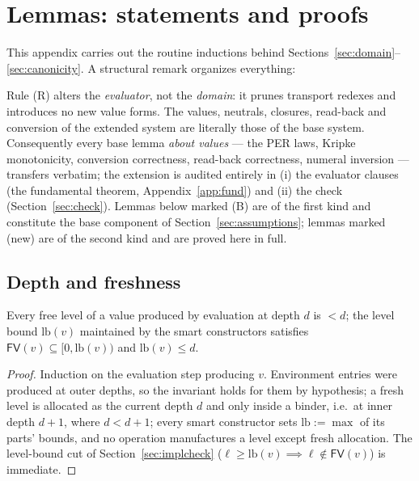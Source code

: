 \documentclass{lmcs}
\newcommand{\FV}{\mathsf{FV}}
\begin{document}
\section{Lemmas: statements and proofs}
\label{app:cases}

This appendix carries out the routine inductions behind
Sections~\ref{sec:domain}--\ref{sec:canonicity}.  A structural remark
organizes everything:

\begin{rem}\label{rem:samedomain}
  Rule (R) alters the \emph{evaluator}, not the \emph{domain}: it
  prunes transport redexes and introduces no new value forms.  The
  values, neutrals, closures, read-back and conversion of the
  extended system are literally those of the base system.
  Consequently every base lemma \emph{about values} --- the PER laws,
  Kripke monotonicity, conversion correctness, read-back correctness,
  numeral inversion --- transfers verbatim; the extension is audited
  entirely in (i) the evaluator clauses (the fundamental theorem,
  Appendix~\ref{app:fund}) and (ii) the check
  (Section~\ref{sec:check}).  Lemmas below marked (B) are of the
  first kind and constitute the base component of
  Section~\ref{sec:assumptions}; lemmas marked (new) are of the
  second kind and are proved here in full.
\end{rem}

\subsection{Depth and freshness}
\label{app:depth}

\begin{lem}\label{lem:L1}
  Every free level of a value produced by evaluation at depth $d$ is
  $< d$; the level bound $\mathrm{lb}(v)$ maintained by the smart
  constructors satisfies $\FV(v) \subseteq [0, \mathrm{lb}(v))$ and
  $\mathrm{lb}(v) \le d$.
\end{lem}
\begin{proof}
  Induction on the evaluation step producing $v$.  Environment
  entries were produced at outer depths, so the invariant holds for
  them by hypothesis; a fresh level is allocated as the current depth
  $d$ and only inside a binder, i.e.\ at inner depth $d{+}1$, where
  $d < d{+}1$; every smart constructor sets
  $\mathrm{lb} := \max$ of its parts' bounds, and no operation
  manufactures a level except fresh allocation.  The level-bound cut
  of Section~\ref{sec:implcheck} ($\ell \ge \mathrm{lb}(v) \implies
  \ell \notin \FV(v)$) is immediate.
\end{proof}
\end{document}
